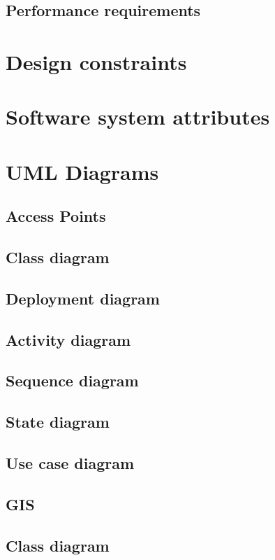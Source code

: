 \documentclass{article}
\begin{document}
	\subsection{Performance requirements}
\section{Design constraints}
\section{Software system attributes}


\clearpage
\section{UML Diagrams}
	\subsection{Access Points}

		\subsection{Class diagram}
		\subsection{Deployment diagram}
		\subsection{Activity diagram}
		\subsection{Sequence diagram}
		\subsection{State diagram}
		\subsection{Use case diagram}


	\clearpage
	
	\subsection{GIS}
		\subsection{Class diagram}
\end{document}
